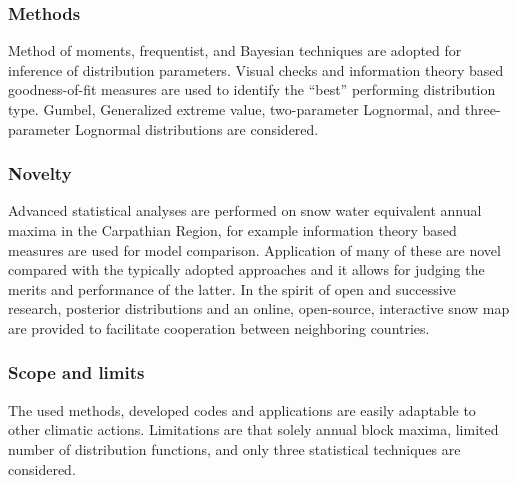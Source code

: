 \subsubsection{Methods}
Method of moments, frequentist, and Bayesian techniques are adopted for inference of distribution parameters. Visual checks and information theory based goodness-of-fit measures are used to identify the ``best'' performing distribution type. Gumbel, Generalized extreme value, two-parameter Lognormal, and three-parameter Lognormal distributions are considered.

\subsubsection{Novelty}
Advanced statistical analyses are performed on snow water equivalent annual maxima in the Carpathian Region, for example information theory based measures are used for model comparison. Application of many of these are novel compared with the typically adopted approaches and it allows for judging the merits and performance of the latter. In the spirit of open and successive research, posterior distributions and an online, open-source, interactive snow map are provided to facilitate cooperation between neighboring countries.

\subsubsection{Scope and limits}
The used methods, developed codes and applications are easily adaptable to other climatic actions. Limitations are that solely annual block maxima, limited number of distribution functions, and only three statistical techniques are considered. 

